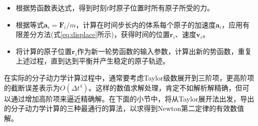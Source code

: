 \begin{itemize}
	\item 根据势函数表达式，得到时刻$t$时原子位置时所有原子所受的力。
	\item 根据等式$\mathbf{a}_i =\mathbf{F}_i/m$，计算在时间步长内的体系每个原子的加速度$\mathbf{a}_i$，应用有限差分方法(式\eqref{eq:displace}所示)，获得时间的位置$\mathbf{r}_i$、速度$\mathbf{v}_i$。
	\item 将计算的原子位置$\mathbf{r}_i$作为新一轮势函数的输入参数，计算出新的势函数，重复上述过程，直到达到平衡并产生稳定的原子轨迹。
\end{itemize}
在实际的分子动力学计算过程中，通常要考虑\textrm{Taylor}级数展开到三阶项，更高阶项的截断误差表示为$O(\Delta t^4)$。这样的数值求解处理，肯定不如解析解精确，但可以通过增加高阶项来逼近精确解。在下面的小节中，将从\textrm{Taylor}展开法出发，导出的分子动力学计算的三种最通行的算法，以求得到\textrm{Newton}第二定律的有效数值解。
